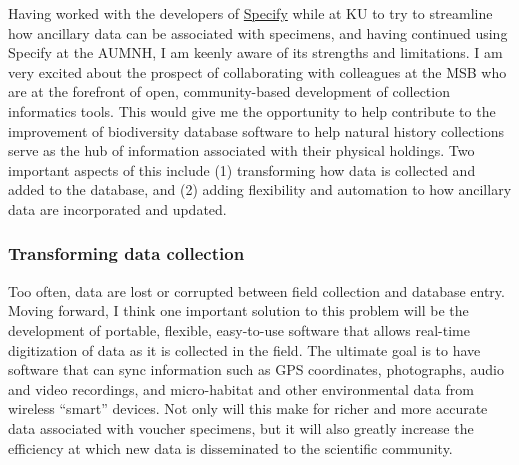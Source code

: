\documentclass[10pt]{article}
\begin{document}
Having worked with the developers of
\href{https://www.sustain.specifysoftware.org/}{Specify} while at KU to try to
streamline how ancillary data can be associated with specimens,
and having continued using Specify at the AUMNH,
I am keenly aware of its strengths and limitations.
I am very excited about the prospect of collaborating with colleagues at the
MSB who are at the forefront of open, community-based development of collection
informatics tools.
This would give me the opportunity to help contribute to the improvement of
biodiversity database software to help natural history collections serve as the
hub of information associated with their physical holdings.
Two important aspects of this include (1) transforming how data is
collected and added to the database, and (2) adding flexibility and automation
to how ancillary data are incorporated and updated.

\subsubsection*{Transforming data collection}
Too often, data are lost or corrupted between field collection and database
entry.
Moving forward, I think one important solution to this problem will be the
development of portable, flexible, easy-to-use software that allows real-time
digitization of data as it is collected in the field.
The ultimate goal is to have software that can sync information such as GPS
coordinates, photographs, audio and video recordings, and micro-habitat and
other environmental data from wireless ``smart'' devices.
Not only will this make for richer and more accurate data associated with
voucher specimens, but it will also greatly increase the efficiency at which
new data is disseminated to the scientific community.
\end{document}
